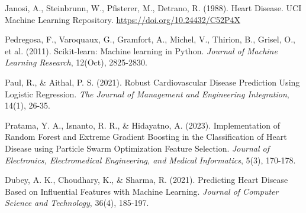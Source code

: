 \documentclass{article}
\begin{document}
\begin{thebibliography}{99}

    Janosi, A., Steinbrunn, W., Pfisterer, M., Detrano, R. (1988). Heart Disease. UCI Machine Learning Repository. \url{https://doi.org/10.24432/C52P4X}

    Pedregosa, F., Varoquaux, G., Gramfort, A., Michel, V., Thirion, B., Grisel, O., et al. (2011). Scikit-learn: Machine learning in Python. \textit{Journal of Machine Learning Research}, 12(Oct), 2825-2830.

    Paul, R., \& Aithal, P. S. (2021). Robust Cardiovascular Disease Prediction Using Logistic Regression. \textit{The Journal of Management and Engineering Integration}, 14(1), 26-35.

    Pratama, Y. A., Isnanto, R. R., \& Hidayatno, A. (2023). Implementation of Random Forest and Extreme Gradient Boosting in the Classification of Heart Disease using Particle Swarm Optimization Feature Selection. \textit{Journal of Electronics, Electromedical Engineering, and Medical Informatics}, 5(3), 170-178.

    Dubey, A. K., Choudhary, K., \& Sharma, R. (2021). Predicting Heart Disease Based on Influential Features with Machine Learning. \textit{Journal of Computer Science and Technology}, 36(4), 185-197.

\end{thebibliography}
\end{document}
